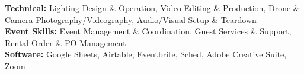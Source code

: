 \noindent
\textbf{Technical:} Lighting Design \& Operation, Video Editing \& Production, Drone \& Camera Photography/Videography, Audio/Visual Setup \& Teardown \\
\textbf{Event Skills:} Event Management \& Coordination, Guest Services \& Support, Rental Order \& PO Management \\
\textbf{Software:} Google Sheets, Airtable, Eventbrite, Sched, Adobe Creative Suite, Zoom
